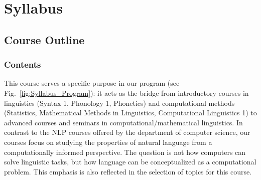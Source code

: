 \setcounter{chapter}{-1}
\chapter{Syllabus}
\label{cha:syllabus}
\setcounter{page}{1}
\pagestyle{fancy}



\section{Course Outline}

\subsection{Contents}

This course serves a specific purpose in our program (see Fig.~\vref{fig:Syllabus_Program}):
it acts as the bridge from introductory courses in linguistics (Syntax 1, Phonology 1, Phonetics) and computational methods (Statistics, Mathematical Methods in Linguistics, Computational Linguistics 1) to advanced courses and seminars in computational\slash mathematical linguistics.
In contrast to the NLP courses offered by the department of computer science, our courses focus on studying the properties of natural language from a computationally informed perspective.
The question is not how computers can solve linguistic tasks, but how language can be conceptualized as a computational problem.
This emphasis is also reflected in the selection of topics for this course.

